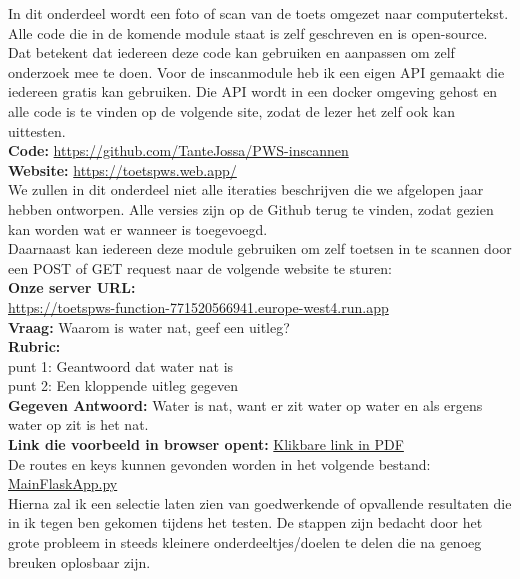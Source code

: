 \documentclass[12pt]{article}
\begin{document}
\begin{multicols}{2}
In dit onderdeel wordt een foto of scan van de toets omgezet naar computertekst. Alle code die in de komende module staat is zelf geschreven en is open-source. Dat betekent dat iedereen deze code kan gebruiken en aanpassen om zelf onderzoek mee te doen. Voor de inscanmodule heb ik een eigen API gemaakt die iedereen gratis kan gebruiken. Die API wordt in een docker omgeving gehost en alle code is te vinden op de volgende site, zodat de lezer het zelf ook kan uittesten. \\
\textbf{Code: }\url{https://github.com/TanteJossa/PWS-inscannen}\\
\textbf{Website: }\url{https://toetspws.web.app/}
\\
We zullen in dit onderdeel niet alle iteraties beschrijven die we afgelopen jaar hebben ontworpen. Alle versies zijn op de Github terug te vinden, zodat gezien kan worden wat er wanneer is toegevoegd. 
\\
Daarnaast kan iedereen deze module gebruiken om zelf toetsen in te scannen door een POST of GET request naar de volgende website te sturen: \\
\textbf{Onze server URL:} \\ \url{https://toetspws-function-771520566941.europe-west4.run.app}\\
\textbf{Vraag:} Waarom is water nat, geef een uitleg?\\
\textbf{Rubric:}\\
punt 1: Geantwoord dat water nat is\\
punt 2: Een kloppende uitleg gegeven
\\
\textbf{Gegeven Antwoord:} Water is nat, want er zit water op water en als ergens water op zit is het nat.\\
\textbf{Link die voorbeeld in browser opent:} \href{https://toetspws-function-771520566941.europe-west4.run.app/grade?rubric=punt%201%3A%20Geantwoord%20dat%20water%20nat%20is%0Apunt%202%3A%20Een%20kloppende%20uitleg%20gegeven&question=Waarom%20is%20water%20nat%2C%20geef%20een%20uitleg%3F&answer=Water%20is%20nat%2C%20want%20er%20zit%20water%20op%20water%20en%20als%20ergens%20water%20op%20zit%20is%20het%20nat}{Klikbare link in PDF}\\
De routes en keys kunnen gevonden worden in het volgende bestand: \\
\href{https://github.com/TanteJossa/PWS-inscannen/blob/main/section_scanner/app/main.py}{MainFlaskApp.py}\\
Hierna zal ik een selectie laten zien van goedwerkende of opvallende resultaten die in ik tegen ben gekomen tijdens het testen. De stappen zijn bedacht door het grote probleem in steeds kleinere onderdeeltjes/doelen te delen die na genoeg breuken oplosbaar zijn. 
\end{multicols}
\end{document}
